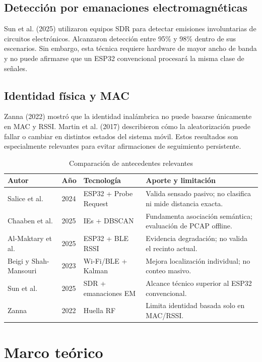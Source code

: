 \documentclass[12pt,a4paper]{article}
\begin{document}
\subsection{Detección por emanaciones electromagnéticas}
Sun et al. (2025) utilizaron equipos SDR para detectar emisiones involuntarias de circuitos electrónicos. Alcanzaron detección entre 95\% y 98\% dentro de sus escenarios. Sin embargo, esta técnica requiere hardware de mayor ancho de banda y no puede afirmarse que un ESP32 convencional procesará la misma clase de señales.

\subsection{Identidad física y MAC}
Zanna (2022) mostró que la identidad inalámbrica no puede basarse únicamente en MAC y RSSI. Martin et al. (2017) describieron cómo la aleatorización puede fallar o cambiar en distintos estados del sistema móvil. Estos resultados son especialmente relevantes para evitar afirmaciones de seguimiento persistente.

\begin{table}[htbp]
\centering
\centering
\caption{Comparación de antecedentes relevantes}
\begin{tabularx}{\textwidth}{@{}p{2.7cm}p{2.4cm}p{3.4cm}X@{}}
\toprule
Autor & Año & Tecnología & Aporte y limitación \\
\midrule
Salice et al. & 2024 & ESP32 + Probe Request & Valida sensado pasivo; no clasifica ni mide distancia exacta. \\
Chaaben et al. & 2025 & IEs + DBSCAN & Fundamenta asociación semántica; evaluación de PCAP offline. \\
Al-Maktary et al. & 2025 & ESP32 + BLE RSSI & Evidencia degradación; no valida el recinto actual. \\
Beigi y Shah-Mansouri & 2023 & Wi-Fi/BLE + Kalman & Mejora localización individual; no conteo masivo. \\
Sun et al. & 2025 & SDR + emanaciones EM & Alcance técnico superior al ESP32 convencional. \\
Zanna & 2022 & Huella RF & Limita identidad basada solo en MAC/RSSI. \\
\bottomrule
\end{tabularx}
\end{table}

\section{Marco teórico}
\end{document}
